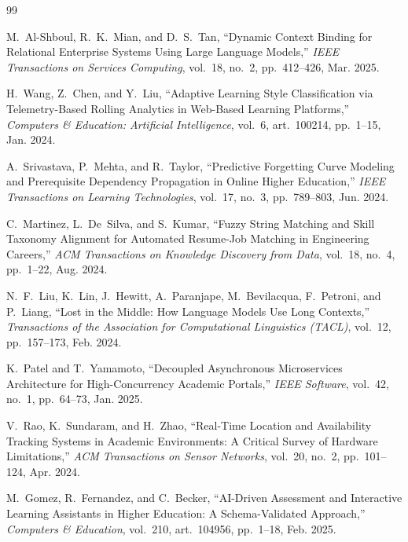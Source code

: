 \documentclass[11pt,a4paper]{article}
\begin{document}
\begin{thebibliography}{99}

M.~Al-Shboul, R.~K.~Mian, and D.~S.~Tan, ``Dynamic Context Binding for Relational Enterprise Systems Using Large Language Models,'' \emph{IEEE Transactions on Services Computing}, vol.~18, no.~2, pp.~412--426, Mar. 2025.

H.~Wang, Z.~Chen, and Y.~Liu, ``Adaptive Learning Style Classification via Telemetry-Based Rolling Analytics in Web-Based Learning Platforms,'' \emph{Computers \& Education: Artificial Intelligence}, vol.~6, art.~100214, pp.~1--15, Jan. 2024.

A.~Srivastava, P.~Mehta, and R.~Taylor, ``Predictive Forgetting Curve Modeling and Prerequisite Dependency Propagation in Online Higher Education,'' \emph{IEEE Transactions on Learning Technologies}, vol.~17, no.~3, pp.~789--803, Jun. 2024.

C.~Martinez, L.~De~Silva, and S.~Kumar, ``Fuzzy String Matching and Skill Taxonomy Alignment for Automated Resume-Job Matching in Engineering Careers,'' \emph{ACM Transactions on Knowledge Discovery from Data}, vol.~18, no.~4, pp.~1--22, Aug. 2024.

N.~F.~Liu, K.~Lin, J.~Hewitt, A.~Paranjape, M.~Bevilacqua, F.~Petroni, and P.~Liang, ``Lost in the Middle: How Language Models Use Long Contexts,'' \emph{Transactions of the Association for Computational Linguistics (TACL)}, vol.~12, pp.~157--173, Feb. 2024.

K.~Patel and T.~Yamamoto, ``Decoupled Asynchronous Microservices Architecture for High-Concurrency Academic Portals,'' \emph{IEEE Software}, vol.~42, no.~1, pp.~64--73, Jan. 2025.

V.~Rao, K.~Sundaram, and H.~Zhao, ``Real-Time Location and Availability Tracking Systems in Academic Environments: A Critical Survey of Hardware Limitations,'' \emph{ACM Transactions on Sensor Networks}, vol.~20, no.~2, pp.~101--124, Apr. 2024.

M.~Gomez, R.~Fernandez, and C.~Becker, ``AI-Driven Assessment and Interactive Learning Assistants in Higher Education: A Schema-Validated Approach,'' \emph{Computers \& Education}, vol.~210, art.~104956, pp.~1--18, Feb. 2025.


\end{thebibliography}
\end{document}
